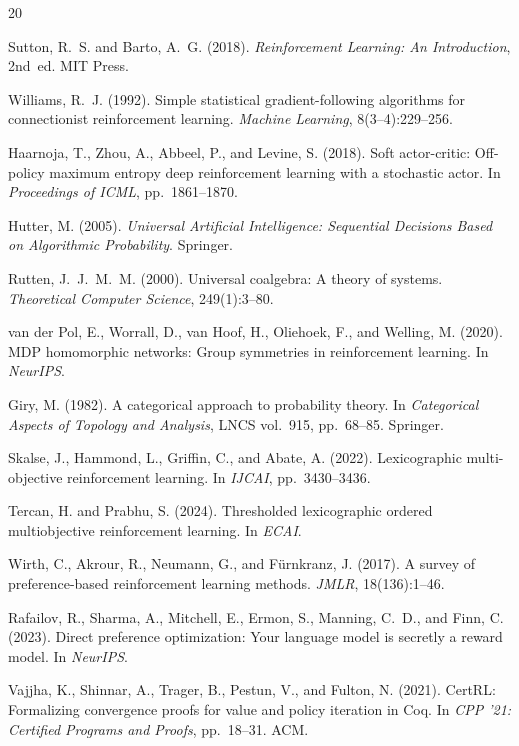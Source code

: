\documentclass[9pt,a4paper]{article}
\theoremstyle{plain}
\theoremstyle{definition}
\theoremstyle{remark}
\begin{document}
\begin{thebibliography}{20}

Sutton, R.~S. and Barto, A.~G. (2018).
\textit{Reinforcement Learning: An Introduction}, 2nd~ed. MIT Press.

Williams, R.~J. (1992).
Simple statistical gradient-following algorithms for connectionist reinforcement learning.
\textit{Machine Learning}, 8(3--4):229--256.

Haarnoja, T., Zhou, A., Abbeel, P., and Levine, S. (2018).
Soft actor-critic: Off-policy maximum entropy deep reinforcement learning with a stochastic actor.
In \textit{Proceedings of ICML}, pp.~1861--1870.

Hutter, M. (2005).
\textit{Universal Artificial Intelligence: Sequential Decisions Based on Algorithmic Probability}. Springer.

Rutten, J.~J.~M.~M. (2000).
Universal coalgebra: A theory of systems.
\textit{Theoretical Computer Science}, 249(1):3--80.

van der Pol, E., Worrall, D., van Hoof, H., Oliehoek, F., and Welling, M. (2020).
MDP homomorphic networks: Group symmetries in reinforcement learning.
In \textit{NeurIPS}.

Giry, M. (1982).
A categorical approach to probability theory.
In \textit{Categorical Aspects of Topology and Analysis}, LNCS vol.~915, pp.~68--85. Springer.

Skalse, J., Hammond, L., Griffin, C., and Abate, A. (2022).
Lexicographic multi-objective reinforcement learning.
In \textit{IJCAI}, pp.~3430--3436.

Tercan, H. and Prabhu, S. (2024).
Thresholded lexicographic ordered multiobjective reinforcement learning.
In \textit{ECAI}.

Wirth, C., Akrour, R., Neumann, G., and F{\"u}rnkranz, J. (2017).
A survey of preference-based reinforcement learning methods.
\textit{JMLR}, 18(136):1--46.

Rafailov, R., Sharma, A., Mitchell, E., Ermon, S., Manning, C.~D., and Finn, C. (2023).
Direct preference optimization: Your language model is secretly a reward model.
In \textit{NeurIPS}.

Vajjha, K., Shinnar, A., Trager, B., Pestun, V., and Fulton, N. (2021).
CertRL: Formalizing convergence proofs for value and policy iteration in Coq.
In \textit{CPP '21: Certified Programs and Proofs}, pp.~18--31. ACM.


\end{thebibliography}
\end{document}
